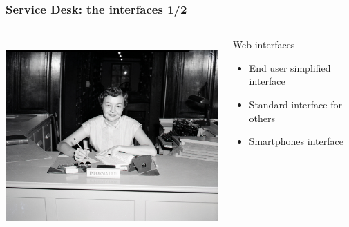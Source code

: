 \documentclass{beamer}
\begin{document}
\begin{frame}

    \frametitle{Service Desk: the interfaces 1/2}

 \begin{columns}
 \begin{column}{0.45\textwidth}
         \includegraphics[height=7.5cm]{./pics/servicedesk2.jpg}
 \end{column}
 \begin{column}{0.45\textwidth}
     \begin{block}{Web interfaces}
        \begin{itemize}
            \item End user simplified interface
            \item Standard interface for others
            \item Smartphones interface
        \end{itemize}
    \end{block}
  
 \end{column}
\end{columns}






\end{frame}
\end{document}
